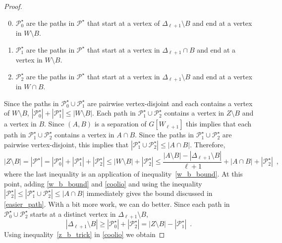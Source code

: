 \documentclass{patmorin}
\begin{document}
\begin{proof}
  \begin{enumerate}\setcounter{enumi}{-1}
      \item $\mathcal{P}^\star_0$ are the paths in $\mathcal{P}^\star$ that start at a vertex of $\Delta_{\ell+1}\setminus B$ and end at a vertex in $W\setminus B$.
      \item $\mathcal{P}^\star_1$ are the paths in $\mathcal{P}^\star$ that start at a vertex in $\Delta_{\ell+1}\cap B$ and end at a vertex in $W\setminus B$.
      \item $\mathcal{P}^\star_2$ are the paths in $\mathcal{P}^\star$ that start at a vertex in $\Delta_{\ell+1}\setminus B$ and end at a vertex in $W\cap B$.
  \end{enumerate}
  Since the paths in $\mathcal{P}_0^\star\cup\mathcal{P}_1^\star$ are pairwise vertex-disjoint and each contains a vertex of $W\setminus B$, $|\mathcal{P}_0^\star|+|\mathcal{P}_1^\star|\le|W\setminus B|$.
  Each path in $\mathcal{P}_1^\star\cup \mathcal{P}_2^\star$ contains a vertex in $Z\setminus B$ and a vertex in $B$.  Since $(A,B)$ is a separation of $G[W_{\ell+1}]$ this implies that each path in $\mathcal{P}_1^\star\cup \mathcal{P}_2^\star$ contains a vertex in $A\cap B$. Since the paths in  $\mathcal{P}_1^\star\cup \mathcal{P}_2^\star$ are pairwise vertex-disjoint, this implies that $|\mathcal{P}_1^\star\cup \mathcal{P}_2^\star|\le |A\cap B|$. Therefore,
  \begin{equation}
     |Z\setminus B| = |\mathcal{P}^\star| = |\mathcal{P}_0^{\star}| + |\mathcal{P}_1^\star| + |\mathcal{P}_2^{\star}|
     \le |W\setminus B| + |\mathcal{P}_2^\star|
     \le \frac{|A\setminus B|-|\Delta_{\ell+1}\setminus B|}{\ell+1}+|A\cap B|+|\mathcal{P}_2^\star|
     \enspace , \label{coolio}
  \end{equation}
  where the last inequality is an application of inequality~\eqref{w_b_bound}.  At this point, adding \eqref{w_b_bound} and \eqref{coolio} and using the inequality $|\mathcal{P}_2^\star| \le |\mathcal{P}_1^\star\cup\mathcal{P}_2^\star|\le |A\cap B|$ immediately gives the bound discussed in \cref{easier_path}.  With a bit more work, we can do better.  Since each path in $\mathcal{P}_0^\star\cup\mathcal{P}^\star_2$ starts at a distinct vertex in $\Delta_{\ell+1}\setminus B$,
  \begin{equation}
      |\Delta_{\ell+1}\setminus B|\ge |\mathcal{P}_0^\star|+|\mathcal{P}^\star_2|=|Z\setminus B|-|\mathcal{P}_1^\star| \enspace . \label{z_b_trick}
  \end{equation}
  Using inequality~\eqref{z_b_trick}  in \cref{coolio} we obtain

\end{proof}
\end{document}
